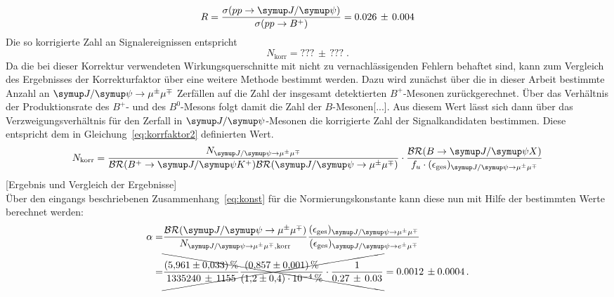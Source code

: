 %
\begin{equation}
  R=\frac{\sigma(pp\rightarrow\jpsi)}{\sigma(pp\rightarrow B^+)}=0.026\,\pm\,0.004
  \label{eq:korrfaktor}
\end{equation}
%
Die so korrigierte Zahl an Signalereignissen entspricht
%
\begin{equation}
  N_\text{korr}=???\,\pm\,???\; .
\end{equation}
%
Da die bei dieser Korrektur verwendeten Wirkungsquerschnitte mit nicht zu vernachlässigenden Fehlern behaftet sind, kann
zum Vergleich des Ergebnisses der Korrekturfaktor über eine weitere Methode bestimmt werden. Dazu wird zunächst über die in
dieser Arbeit bestimmte Anzahl an $\kontroll$ Zerfällen auf die Zahl der insgesamt detektierten $B^{+}$-Mesonen zurückgerechnet. Über das Verhältnis der Produktionsrate des $B^{+}$- und des $B^{0}$-Mesons folgt damit die Zahl der
$B$-Mesonen[...]. Aus diesem Wert lässt sich dann über das Verzweigungsverhältnis für den Zerfall in $\jpsi$-Mesonen die korrigierte Zahl der Signalkandidaten bestimmen. Diese entspricht dem in Gleichung~\eqref{eq:korrfaktor2} definierten Wert.
%
\begin{equation}
  N_\text{korr}=\frac{N_{\kontroll}}{\mathcal{BR}(B^{+}\rightarrow\jpsi K^{+})\mathcal{BR}(\kontroll)}\cdot\frac{\mathcal{BR}(B\rightarrow\jpsi X)}{f_u\cdot(\epsilon_{\text{ges}})_{\kontroll}}
  \label{eq:korrfaktor2}
\end{equation}
%
[Ergebnis und Vergleich der Ergebnisse]\\
Über den eingangs beschriebenen Zusammenhang~\eqref{eq:konst} für die Normierungskonstante kann diese nun mit Hilfe der bestimmten Werte berechnet werden:
%
\begin{align*}
  \alpha=&\frac{\mathcal{BR}(\kontroll)}{N_{\kontroll,\text{korr}}}\frac{(\epsilon_{\text{ges}})_{\kontroll}}{(\epsilon_{\text{ges}})_{\signal}} \\
  =&\xcancel{\frac{\SI{5,961(33)}{\percent}}{1335240\,\pm\,1155}\frac{\SI{0.857(1)}{\percent}}{\SI{1.2(4)e-4}{\percent}}\cdot\frac{1}{0.27\,\pm\,0.03}}=0.0012\,\pm0.0004 \, .
\end{align*}
